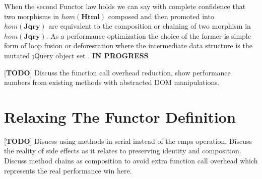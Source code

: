 \documentclass[preprint, leqno]{sigplanconf}
\begin{document}
 When the second Functor law holds we can say with complete confidence that two morphisms in \begin{math}hom(\mathbf{Html})\end{math} composed and then promoted into \begin{math}hom(\mathbf{Jqry})\end{math} are equivalent to the composition or chaining of two morphism in \begin{math}hom(\mathbf{Jqry})\end{math}. As a performance optimization the choice of the former is simple form of loop fusion or deforestation where the intermediate data structure is the mutated jQuery object set \cite{bib:deforestation}.
\textbf{IN PROGRESS}


[\textbf{TODO}] Discuss the function call overhead reduction, show performance numbers from existing methods with abstracted DOM manipulations.


\section{Relaxing The Functor Definition}

[\textbf{TODO}] Disucss using methods in serial instead of the cmps operation. Discuss the reality of side effects as it relates to preserving identity and composition. Discuss method chains as composition to avoid extra function call overhead which represents the real performance win here.
\end{document}
